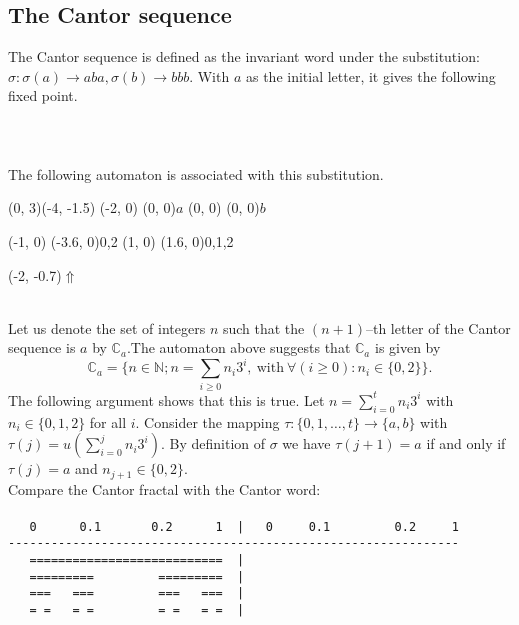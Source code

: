 \documentclass{article}
\begin{document}
\subsection{The Cantor sequence}
The Cantor sequence is defined as the invariant word under the substitution: 
$\sigma: \sigma(a) \to aba, \sigma(b) \to bbb$. With $a$ as the
initial letter, it gives the following fixed point.\\
\\
\\
\\
The following automaton is associated with this
substitution.\\
\begin{graph}(0, 3)(-4, -1.5)
  (-2, 0) (0, 0){$a$}
  (0, 0)  (0, 0){$b$}

  (-1, 0) \freetext(-3.6, 0){0,2}
   
  (1, 0) \freetext(1.6, 0){0,1,2}

  \freetext(-2, -0.7){$\Uparrow$}
\end{graph}\\
Let us denote the set of integers $n$ such that the $(n + 1)$--th letter of the
Cantor sequence is $a$ by $\mathbb{C}_a$.The automaton above suggests that 
$\mathbb{C}_a$ is given by
\begin{displaymath}
  \mathbb{C}_a = \Big\{n \in \mathbb{N}; n = \sum_{i \ge 0} n_i3^i,
  \mathrm{\ with\ } \forall(i \ge 0): n_i \in \{0, 2\}\Big\}.
\end{displaymath}
The following argument shows that this is true. Let 
$n = \sum_{i = 0}^t n_i 3^i$ with $n_i \in \{0, 1, 2\}$ for all $i$. Consider 
the mapping $\tau: \{0, 1, \ldots, t\} \to \{a, b\}$ with 
$\tau(j) = u(\sum_{i = 0}^j n_i 3^i)$. By definition of $\sigma$ we have 
$\tau(j + 1) = a$ if and only if $\tau(j) = a$ and $n_{j + 1} \in \{0, 2\}$.
\\
Compare the Cantor fractal with the Cantor word:\\
\\
\verb#   0      0.1       0.2      1  |   0     0.1         0.2     1#\\
\verb#---------------------------------------------------------------#\\
\verb#   ===========================  |               #\\
\verb#   =========         =========  |      # { } { } { } { } { } { } { } { } { } { } { } { }\\
\verb#   ===   ===         ===   ===  |   #\\
\verb#   = =   = =         = =   = =  |  #\\
\\
\end{document}
